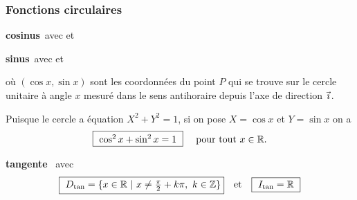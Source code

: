 \begin{frame}
\frametitle{\bf Fonctions circulaires}
\medskip 

\begin{itemize}
\parbox{10cm}{
\bitem
{\bf cosinus}\ \quad avec\quad  
{}\quad et\quad {}
}
\vspace*{3mm}

\bitem
{\bf sinus}\ \quad avec\quad 
{}\quad et\quad {}
\vspace*{3mm}

\parbox[t]{6cm}{
o\`u $(\cos x,\sin x)$ sont les coordonn\'ees du point $P$ 
qui se trouve sur le cercle unitaire \`a angle $x$ 
mesur\'e dans le sens antihoraire depuis l'axe de direction $\vi$. 
\vspace*{1mm}

Puisque le cercle a \'equation $X^2+Y^2=1$, si on pose $X=\cos x$ et 
$Y=\sin x$ on a
$$
\mbox{\framebox{\ 
$\cos^2 x + \sin^2 x = 1$\ } \quad pour tout $x\in\R$.}
$$
}
\quad{}

\pause
\bitem
{\bf tangente}\ \quad 
avec\quad 
$$
\mbox{
\framebox{\ $D_{\tan}=\{ x\in\R\ |\ x\neq \frac{\pi}{2}+k\pi,\ k\in\Z\}$}\quad 
et\quad \framebox{\ $I_{\tan}=\R$\ }
}
$$
\end{itemize}

\end{frame}



